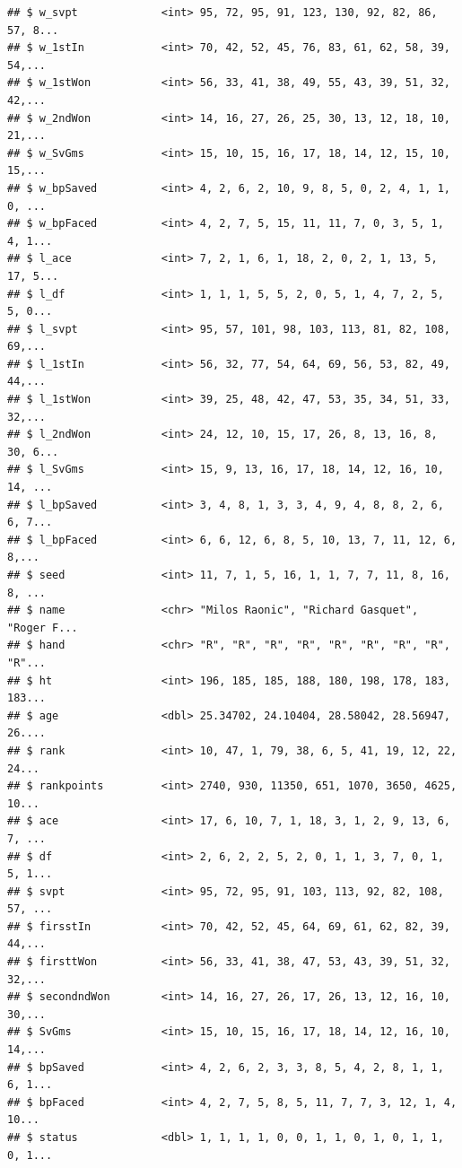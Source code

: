 \documentclass[]{article}
\begin{document}
\begin{verbatim}
## $ w_svpt             <int> 95, 72, 95, 91, 123, 130, 92, 82, 86, 57, 8...
## $ w_1stIn            <int> 70, 42, 52, 45, 76, 83, 61, 62, 58, 39, 54,...
## $ w_1stWon           <int> 56, 33, 41, 38, 49, 55, 43, 39, 51, 32, 42,...
## $ w_2ndWon           <int> 14, 16, 27, 26, 25, 30, 13, 12, 18, 10, 21,...
## $ w_SvGms            <int> 15, 10, 15, 16, 17, 18, 14, 12, 15, 10, 15,...
## $ w_bpSaved          <int> 4, 2, 6, 2, 10, 9, 8, 5, 0, 2, 4, 1, 1, 0, ...
## $ w_bpFaced          <int> 4, 2, 7, 5, 15, 11, 11, 7, 0, 3, 5, 1, 4, 1...
## $ l_ace              <int> 7, 2, 1, 6, 1, 18, 2, 0, 2, 1, 13, 5, 17, 5...
## $ l_df               <int> 1, 1, 1, 5, 5, 2, 0, 5, 1, 4, 7, 2, 5, 5, 0...
## $ l_svpt             <int> 95, 57, 101, 98, 103, 113, 81, 82, 108, 69,...
## $ l_1stIn            <int> 56, 32, 77, 54, 64, 69, 56, 53, 82, 49, 44,...
## $ l_1stWon           <int> 39, 25, 48, 42, 47, 53, 35, 34, 51, 33, 32,...
## $ l_2ndWon           <int> 24, 12, 10, 15, 17, 26, 8, 13, 16, 8, 30, 6...
## $ l_SvGms            <int> 15, 9, 13, 16, 17, 18, 14, 12, 16, 10, 14, ...
## $ l_bpSaved          <int> 3, 4, 8, 1, 3, 3, 4, 9, 4, 8, 8, 2, 6, 6, 7...
## $ l_bpFaced          <int> 6, 6, 12, 6, 8, 5, 10, 13, 7, 11, 12, 6, 8,...
## $ seed               <int> 11, 7, 1, 5, 16, 1, 1, 7, 7, 11, 8, 16, 8, ...
## $ name               <chr> "Milos Raonic", "Richard Gasquet", "Roger F...
## $ hand               <chr> "R", "R", "R", "R", "R", "R", "R", "R", "R"...
## $ ht                 <int> 196, 185, 185, 188, 180, 198, 178, 183, 183...
## $ age                <dbl> 25.34702, 24.10404, 28.58042, 28.56947, 26....
## $ rank               <int> 10, 47, 1, 79, 38, 6, 5, 41, 19, 12, 22, 24...
## $ rankpoints         <int> 2740, 930, 11350, 651, 1070, 3650, 4625, 10...
## $ ace                <int> 17, 6, 10, 7, 1, 18, 3, 1, 2, 9, 13, 6, 7, ...
## $ df                 <int> 2, 6, 2, 2, 5, 2, 0, 1, 1, 3, 7, 0, 1, 5, 1...
## $ svpt               <int> 95, 72, 95, 91, 103, 113, 92, 82, 108, 57, ...
## $ firsstIn           <int> 70, 42, 52, 45, 64, 69, 61, 62, 82, 39, 44,...
## $ firsttWon          <int> 56, 33, 41, 38, 47, 53, 43, 39, 51, 32, 32,...
## $ secondndWon        <int> 14, 16, 27, 26, 17, 26, 13, 12, 16, 10, 30,...
## $ SvGms              <int> 15, 10, 15, 16, 17, 18, 14, 12, 16, 10, 14,...
## $ bpSaved            <int> 4, 2, 6, 2, 3, 3, 8, 5, 4, 2, 8, 1, 1, 6, 1...
## $ bpFaced            <int> 4, 2, 7, 5, 8, 5, 11, 7, 7, 3, 12, 1, 4, 10...
## $ status             <dbl> 1, 1, 1, 1, 0, 0, 1, 1, 0, 1, 0, 1, 1, 0, 1...
\end{verbatim}
\end{document}
